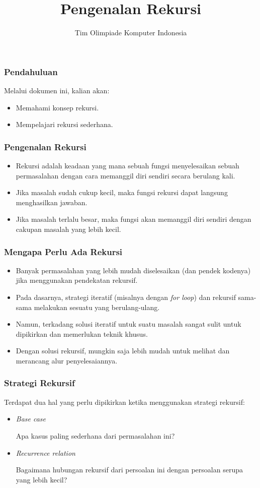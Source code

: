

\title{Pengenalan Rekursi}
\author{Tim Olimpiade Komputer Indonesia}
\date{}



\begin{frame}
\titlepage
\end{frame}

\begin{frame}
\frametitle{Pendahuluan}
Melalui dokumen ini, kalian akan:
\begin{itemize}
  \item Memahami konsep rekursi.
  \item Mempelajari rekursi sederhana.
\end{itemize}
\end{frame}

\begin{frame}
\frametitle{Pengenalan Rekursi}
\begin{itemize}
  \item Rekursi adalah keadaan yang mana sebuah fungsi menyelesaikan sebuah permasalahan dengan cara memanggil diri sendiri secara berulang kali.
  \item Jika masalah sudah cukup kecil, maka fungsi rekursi dapat langsung menghasilkan jawaban.
  \item Jika masalah terlalu besar, maka fungsi akan memanggil diri sendiri dengan cakupan masalah yang lebih kecil.
\end{itemize}
\end{frame}

\begin{frame}
\frametitle{Mengapa Perlu Ada Rekursi}
\begin{itemize}
  \item Banyak permasalahan yang lebih mudah diselesaikan (dan pendek kodenya) jika menggunakan pendekatan rekursif.
  \item Pada dasarnya, strategi iteratif (misalnya dengan \textit{for loop}) dan rekursif sama-sama melakukan sesuatu yang berulang-ulang. 
  \item Namun, terkadang solusi iteratif  untuk suatu masalah sangat sulit untuk dipikirkan dan memerlukan teknik khusus.
  \item Dengan solusi rekursif, mungkin saja lebih mudah untuk melihat dan merancang alur penyelesaiannya.
\end{itemize}
\end{frame}

\begin{frame}
\frametitle{Strategi Rekursif}
Terdapat dua hal yang perlu dipikirkan ketika menggunakan strategi rekursif:
\begin{itemize}
  \item \textit{Base case}
  
  Apa kasus paling sederhana dari permasalahan ini?
  
  \item \textit{Recurrence relation}
  
  Bagaimana hubungan rekursif dari persoalan ini dengan persoalan serupa yang lebih kecil?
\end{itemize}
\end{frame}

